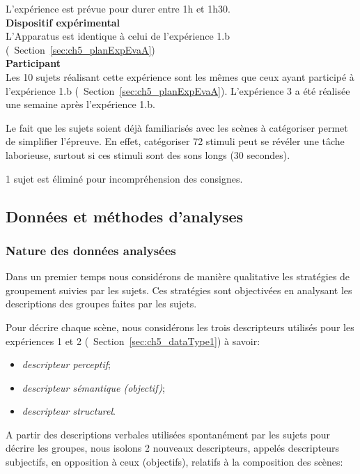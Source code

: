 L'expérience est prévue pour durer entre 1h et 1h30. \\

{\setlength{\parindent}{0cm}\textbf{Dispositif expérimental}} \\

L'Apparatus est identique à celui de l'expérience 1.b (\cf~Section~\ref{sec:ch5_planExpEvaA}) \\

{\setlength{\parindent}{0cm}\textbf{Participant}} \\

Les 10 sujets réalisant cette expérience sont les mêmes que ceux ayant participé à l'expérience 1.b (\cf~Section~\ref{sec:ch5_planExpEvaA}). L'expérience 3 a été réalisée une semaine après l'expérience 1.b. 

Le fait que les sujets soient déjà familiarisés avec les scènes à catégoriser permet de simplifier l'épreuve. En effet, catégoriser 72 stimuli peut se révéler une tâche laborieuse, surtout si ces stimuli sont des sons longs (30 secondes).

1 sujet est éliminé pour incompréhension des consignes.

\subsection{Données et méthodes d'analyses}

\subsubsection{Nature des données analysées}
\label{sec:ch5_dataXp3}

Dans un premier temps nous considérons de manière qualitative les stratégies de groupement suivies par les sujets. Ces stratégies sont objectivées en analysant les descriptions des groupes faites par les sujets.

Pour décrire chaque scène, nous considérons les trois descripteurs utilisés pour les expériences 1 et 2 (\cf~Section~\ref{sec:ch5_dataType1}) à savoir:

\begin{itemize}
\item \emph{descripteur perceptif};
\item \emph{descripteur sémantique (objectif)};
\item \emph{descripteur structurel}.
\end{itemize}

A partir des descriptions verbales utilisées spontanément par les sujets pour décrire les groupes, nous isolons 2 nouveaux descripteurs, appelés descripteurs subjectifs, en opposition à ceux (objectifs), relatifs à la composition des scènes:

